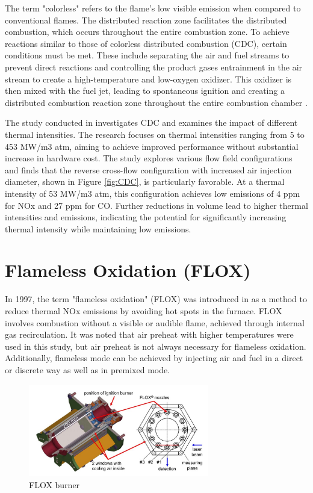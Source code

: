 The term "colorless" refers to the flame's low visible emission when compared to conventional flames. The distributed reaction zone facilitates the distributed combustion, which occurs throughout the entire combustion zone. To achieve reactions similar to those of colorless distributed combustion (CDC), certain conditions must be met. These include separating the air and fuel streams to prevent direct reactions and controlling the product gases entrainment in the air stream to create a high-temperature and low-oxygen oxidizer. This oxidizer is then mixed with the fuel jet, leading to spontaneous ignition and creating a distributed combustion reaction zone throughout the entire combustion chamber \cite{ARGHODE201129}.

The study conducted in \cite{ARGHODE2013930} investigates CDC and examines the impact of different thermal intensities. The research focuses on thermal intensities ranging from 5 to 453 MW/m3 atm, aiming to achieve improved performance without substantial increase in hardware cost. The study explores various flow field configurations and finds that the reverse cross-flow configuration with increased air injection diameter, shown in Figure \ref{fig:CDC}, is particularly favorable. At a thermal intensity of 53 MW/m3 atm, this configuration achieves low emissions of 4 ppm for NOx and 27 ppm for CO. Further reductions in volume lead to higher thermal intensities and emissions, indicating the potential for significantly increasing thermal intensity while maintaining low emissions.
 
\section{Flameless Oxidation (FLOX)}
In 1997, the term "flameless oxidation" (FLOX) was introduced in \cite{WUNNING199781} as a method to reduce thermal NOx emissions by avoiding hot spots in the furnace. FLOX involves combustion without a visible or audible flame, achieved through internal gas recirculation. It was noted that air preheat with higher temperatures were used in this study, but air preheat is not always necessary for flameless oxidation. Additionally, flameless mode can be achieved by injecting air and fuel in a direct or discrete way as well as in premixed mode.

\begin{figure}[!h]
    \centering    
    \includegraphics[width=0.7\textwidth]{Chapter2/Images/FLOX.jpeg}
    \caption[FLOX burner]{FLOX burner \cite{LAMMEL4001825}}
    \label{fig:FLOX}
\end{figure}

